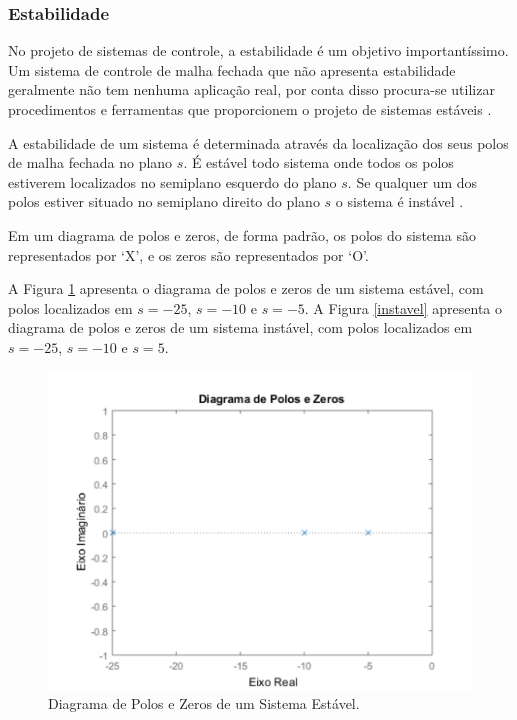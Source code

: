 \documentclass[journal,brazil,english]{IEEEtran}
\begin{document}
\subsubsection{Estabilidade}
No projeto de sistemas de controle, a estabilidade é um objetivo importantíssimo. Um sistema de controle de malha fechada que não apresenta estabilidade geralmente não tem nenhuma aplicação real, por conta disso procura-se utilizar procedimentos e ferramentas que proporcionem o projeto de sistemas estáveis \cite{dorf}.

A estabilidade de um sistema é determinada através da localização dos seus polos de malha fechada no plano $s$. É estável todo sistema onde todos os polos estiverem localizados no semiplano esquerdo do plano $s$. Se qualquer um dos polos estiver situado  no semiplano direito do plano $s$ o sistema é instável \cite{ogata}.

Em um diagrama de polos e zeros, de forma padrão, os polos do sistema são representados por `X', e os zeros são representados por `O'.

A Figura \ref{estavel} apresenta o diagrama de polos e zeros de um sistema estável, com polos localizados em $s=-25$, $s=-10$ e $s=-5$. A Figura \ref{instavel} apresenta o diagrama de polos e zeros de um sistema instável, com polos localizados em $s=-25$, $s=-10$ e $s=5$.

\begin{figure}[H]
	\centering
	\includegraphics[width=\columnwidth]{./imagens/sistema_estavel.pdf}
    \renewcommand{\figurename}{Fig.}
    \caption{Diagrama de Polos e Zeros de um Sistema Estável.}
	\label{estavel}
\end{figure}
\end{document}
